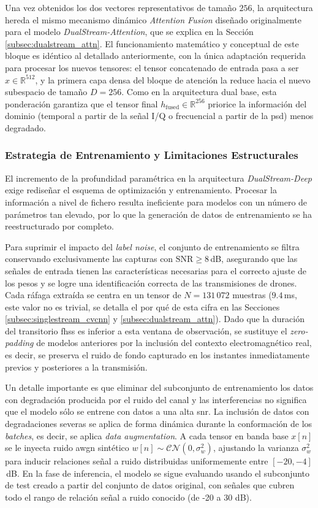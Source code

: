 Una vez obtenidos los dos vectores representativos de tamaño $256$, la arquitectura hereda el mismo mecanismo dinámico \textit{Attention Fusion} diseñado originalmente para el modelo \textit{DualStream-Attention}, que se explica en la Sección \ref{subsec:dualstream_attn}. El funcionamiento matemático y conceptual de este bloque es idéntico al detallado anteriormente, con la única adaptación requerida para procesar los nuevos tensores: el tensor concatenado de entrada pasa a ser $x \in \mathbb{R}^{512}$, y la primera capa densa del bloque de atención la reduce hacia el nuevo subespacio de tamaño $D=256$. Como en la arquitectura dual base, esta ponderación garantiza que el tensor final $h_{\text{fused}} \in \mathbb{R}^{256}$ priorice la información del dominio (temporal a partir de la señal I/Q o frecuencial a partir de la \gls{psd}) menos degradado.

\subsubsection{Estrategia de Entrenamiento y Limitaciones Estructurales}
El incremento de la profundidad paramétrica en la arquitectura \textit{DualStream-Deep} exige rediseñar el esquema de optimización y entrenamiento. Procesar la información a nivel de fichero resulta ineficiente para modelos con un número de parámetros tan elevado, por lo que la generación de datos de entrenamiento se ha reestructurado por completo.

Para suprimir el impacto del \textit{label noise}, el conjunto de entrenamiento se filtra conservando exclusivamente las capturas con $\text{SNR} \ge 8$\,dB, asegurando que las señales de entrada tienen las características necesarias para el correcto ajuste de los pesos y se logre una identificación correcta de las transmisiones de drones. Cada ráfaga extraída se centra en un tensor de $N = 131\,072$ muestras ($9.4$\,ms, este valor no es trivial, se detalla el por qué de esta cifra en las Secciones \ref{subsec:singlestream_cvcnn} y \ref{subsec:dualstream_attn}). Dado que la duración del transitorio \gls{fhss} es inferior a esta ventana de observación, se sustituye el \textit{zero-padding} de modelos anteriores por la inclusión del contexto electromagnético real, es decir, se preserva el ruido de fondo capturado en los instantes inmediatamente previos y posteriores a la transmisión.

Un detalle importante es que eliminar del subconjunto de entrenamiento los datos con degradación producida por el ruido del canal y las interferencias no significa que el modelo sólo se entrene con datos a una alta \gls{snr}. La inclusión de datos con degradaciones severas se aplica de forma dinámica durante la conformación de los \textit{batches}, es decir, se aplica \textit{data augmentation}. A cada tensor en banda base $x[n]$ se le inyecta ruido \gls{awgn} sintético $w[n] \sim \mathcal{CN}(0, \sigma_w^2)$, ajustando la varianza $\sigma_w^2$ para inducir relaciones señal a ruido distribuidas uniformemente entre $[-20, -4]$\,dB. En la fase de inferencia, el modelo se sigue evaluando usando el subconjunto de test creado a partir del conjunto de datos original, con señales que cubren todo el rango de relación señal a ruido conocido (de -20 a 30 dB).

